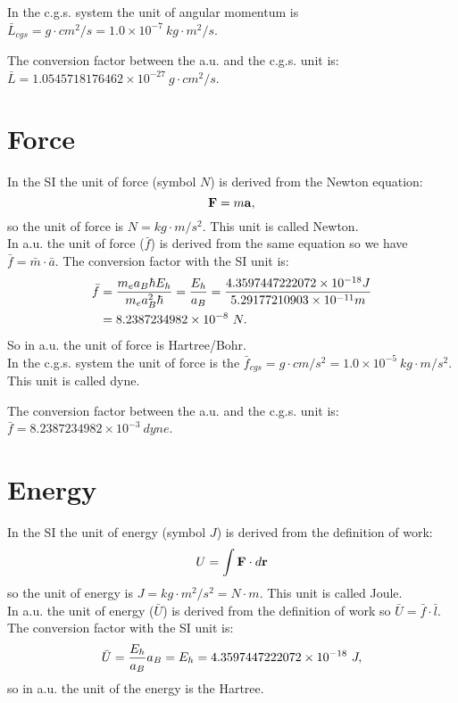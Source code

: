 \documentclass[12pt,a4paper]{article}
\def\barl{5.29177210903\times 10^{-11}}
\def\barf{8.2387234982\times 10^{-8}}
\def\baru{4.3597447222072\times 10^{-18}}
\def\ltol{1.0\times 10^{-7}}
\def\ftof{1.0\times 10^{-5}}
\def\baramcgs{1.0545718176462\times 10^{-27}}
\def\barfcgs{8.2387234982\times 10^{-3}}
\begin{document}
{\color{orange} In the c.g.s. system the unit of angular momentum is 
$\bar L_{cgs}=g\cdot cm^2/s = \ltol\ kg\cdot m^2/s$.
\\
}

{\color{green} The conversion factor between the a.u. and the c.g.s. unit is:
$\bar L=\baramcgs\ g\cdot cm^2/s$.
\\
}

\newpage
\section{\color{coral}Force}
In the SI the unit of force (symbol $N$) is derived from  
the Newton equation:
\begin{equation}
{\bf F}= m {\bf a},
\end{equation} 
so the unit of force is $N=kg\cdot m/s^2$. This unit is called Newton.
\\

{\color{web-blue} In a.u. the unit of force ($\bar f$) is derived 
from the same equation so we have $\bar f =\bar m \cdot \bar a$. The
conversion factor with the SI unit is: 
\begin{align}
\bar f &= {m_e a_B \hbar E_h \over m_e a_B^2 \hbar }= 
{E_h\over a_B}\nonumber={\baru J \over \barl m}\nonumber \\
&=\barf\ N. 
\end{align}
So in a.u. the unit of force is Hartree/Bohr.
}
\\

{\color{orange} In the c.g.s. system the unit of force is the 
$\bar f_{cgs}=g\cdot cm/s^2 = \ftof\ kg\cdot m/s^2$. This unit is 
called dyne.
\\
}

{\color{green} The conversion factor between the a.u. and the c.g.s. unit is:
$\bar f=\barfcgs\ dyne$.
\\
}
\newpage

\section{\color{coral}Energy}
In the SI the unit of energy (symbol $J$) is derived from the 
definition of work: 
\begin{equation}
U= \int {\bf F} \cdot d{\bf r}
\end{equation} 
so the unit of energy is $J=kg\cdot m^2/s^2=N\cdot m$. This unit is 
called Joule.
\\

{\color{web-blue} In a.u. the unit of energy ($\bar U$) is derived 
from the definition of work so $\bar U =\bar f \cdot \bar l$. The 
conversion factor with the SI unit is: 
\begin{equation}
\bar U = {E_h\over a_B} a_B=E_h=\baru\ J, 
\end{equation}
so in a.u. the unit of the energy is the Hartree.
}
\\
\end{document}
